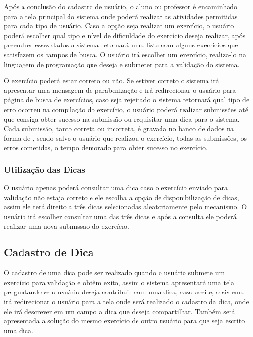 Após a conclusão do cadastro de usuário, o aluno ou professor é encaminhado para a tela principal do sistema onde poderá realizar as atividades permitidas para cada tipo de usuário. Caso a opção seja realizar um exercício, o usuário poderá escolher qual tipo e nível de dificuldade do exercício deseja realizar, após preencher esses dados o sistema retornará uma lista com alguns exercícios que satisfazem os campos de busca. O usuário irá escolher um exercício, realiza-lo na linguagem de programação que deseja e submeter para a validação do sistema. 

O exercício poderá estar correto ou não. Se estiver correto o sistema irá apresentar uma mensagem de parabenização e irá redirecionar o usuário para página de busca de exercícios, caso seja rejeitado o sistema retornará qual tipo de erro ocorreu na compilação do exercício, o usuário poderá realizar submissões até que consiga obter sucesso na submissão ou requisitar uma dica para o sistema. Cada submissão, tanto correta ou incorreta, é gravada no banco de dados na forma de , sendo salvo o usuário que realizou o exercício, todas as submissões, os erros cometidos, o tempo demorado para obter sucesso no exercício.

\subsubsection{Utilização das Dicas}

O usuário apenas poderá consultar uma dica caso o exercício enviado para validação não estaja correto e ele escolha a opção de disponibilização de dicas, assim ele terá direito a três dicas selecionadas aleatoriamente pelo mecanismo. O usuário irá escolher consultar uma das três dicas e após a consulta ele poderá realizar uma nova submissão do exercício.

\subsection{Cadastro de Dica}

O cadastro de uma dica pode ser realizado quando o usuário submete um exercício para validação e obtêm exito, assim o sistema apresentará uma tela perguntando se o usuário deseja contribuir com uma dica, caso aceite, o sistema irá redirecionar o usuário para a tela onde será realizado o cadastro da dica, onde ele irá descrever em um campo a dica que deseja compartilhar. Também será apresentada a solução do mesmo exercício de outro usuário para que seja escrito uma dica. 

